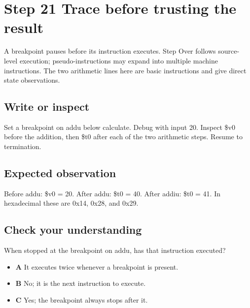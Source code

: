 \section{Step 21 Trace before trusting the
  result}\label{001-console-calculation-s21-step-21-trace-before-trusting-the-result}

A breakpoint pauses before its instruction executes. Step Over follows
source-level execution; pseudo-instructions may expand into multiple
machine instructions. The two arithmetic lines here are basic
instructions and give direct state observations.

\subsection{Write or
  inspect}\label{001-console-calculation-s21-write-or-inspect}

Set a breakpoint on addu below calculate. Debug with input 20. Inspect
\$v0 before the addition, then \$t0 after each of the two arithmetic
steps. Resume to termination.

\subsection{Expected
  observation}\label{001-console-calculation-s21-expected-observation}

Before addu: \$v0 = 20. After addu: \$t0 = 40. After addiu: \$t0 = 41.
In hexadecimal these are 0x14, 0x28, and 0x29.

\subsection{Check your
  understanding}\label{001-console-calculation-s21-check-your-understanding}

When stopped at the breakpoint on addu, has that instruction executed?

\begin{itemize}
  \tightlist
  \item
        \textbf{A} It executes twice whenever a breakpoint is present.
  \item
        \textbf{B} No; it is the next instruction to execute.
  \item
        \textbf{C} Yes; the breakpoint always stops after it.
\end{itemize}
